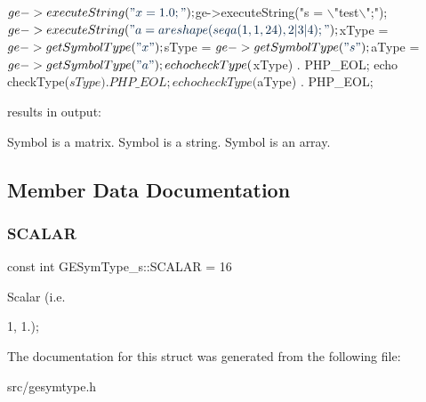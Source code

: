 \begin{DoxyCode}
$ge->executeString(\textcolor{stringliteral}{"x = 1.0;"});
$ge->executeString(\textcolor{stringliteral}{"s = \(\backslash\)"test\(\backslash\)";"});
$ge->executeString(\textcolor{stringliteral}{"a = areshape(seqa(1, 1, 24), 2|3|4);"});

$xType = $ge->getSymbolType(\textcolor{stringliteral}{"x"});
$sType = $ge->getSymbolType(\textcolor{stringliteral}{"s"});
$aType = $ge->getSymbolType(\textcolor{stringliteral}{"a"});

echo checkType($xType) . PHP\_EOL;
echo checkType($sType) . PHP\_EOL;
echo checkType($aType) . PHP\_EOL;
\end{DoxyCode}
 results in output\+: 
\begin{DoxyCode}
Symbol is a matrix.
Symbol is a \textcolor{keywordtype}{string}.
Symbol is an array.
\end{DoxyCode}
 

\subsection{Member Data Documentation}
\mbox{\label{struct_g_e_sym_type__s_a4868e0d2833270b164c4a78b497f4fdc}} 
\subsubsection{\texorpdfstring{S\+C\+A\+L\+AR}{SCALAR}}
{\footnotesize\ttfamily const int G\+E\+Sym\+Type\+\_\+s\+::\+S\+C\+A\+L\+AR = 16\hspace{0.3cm}{\ttfamily [static]}}



Scalar (i.\+e. 

1, 1.); 

The documentation for this struct was generated from the following file\+:\begin{DoxyCompactItemize}
\item 
src/gesymtype.\+h\end{DoxyCompactItemize}
